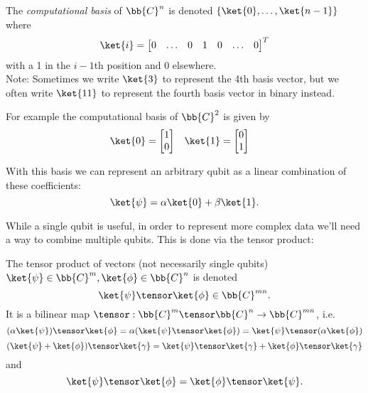 \documentclass{article}
\begin{document}
        \begin{notation}
                The \textit{computational basis} of $\bb{C}^n$ is denoted $\{\ket{0}, \dots, \ket{n-1}\}$ where
                        $$\ket{i} = \begin{bmatrix} 0 & \dots & 0 & 1 & 0 & \dots & 0 \end{bmatrix}^T$$
                with a 1 in the $i-1$th position and 0 elsewhere.\\
                Note: Sometimes we write $\ket{3}$ to represent the 4th basis vector, but we often write $\ket{11}$ to represent the fourth basis vector in binary instead.
        \end{notation}
        For example the computational basis of $\bb{C}^2$ is given by
        \begin{align*}
        \ket{0} &= \begin{bmatrix} 1 \\ 0 \end{bmatrix} & \ket{1} &= \begin{bmatrix} 0 \\ 1 \end{bmatrix}
        \end{align*}

        With this basis we can represent an arbitrary qubit as a linear combination of these coefficients:
                $$\ket{\psi} = \alpha \ket{0} + \beta \ket{1}.$$

        While a single qubit is useful, in order to represent more complex data we'll need a way to combine multiple qubits.
        This is done via the tensor product:

        \begin{definition}[Tensor]
                The tensor product of vectors (not necessarily single qubits) $\ket{\psi} \in \bb{C}^m, \ket{\phi} \in \bb{C}^n$ is denoted
                        $$\ket{\psi} \tensor \ket{\phi} \in \bb{C}^{mn}.$$
                It is a bilinear map $\tensor : \bb{C}^m \tensor \bb{C}^n \to \bb{C}^{mn}$, i.e.
                $$(\alpha \ket{\psi}) \tensor \ket{\phi} = \alpha (\ket{\psi} \tensor \ket{\phi}) = \ket{\psi} \tensor (\alpha \ket{\phi})$$
                $$(\ket{\psi} + \ket{\phi}) \tensor \ket{\gamma} = \ket{\psi} \tensor \ket{\gamma} + \ket{\phi} \tensor \ket{\gamma}$$
                and
                $$\ket{\psi} \tensor \ket{\phi} = \ket{\phi} \tensor \ket{\psi}.$$
        \end{definition}
\end{document}
